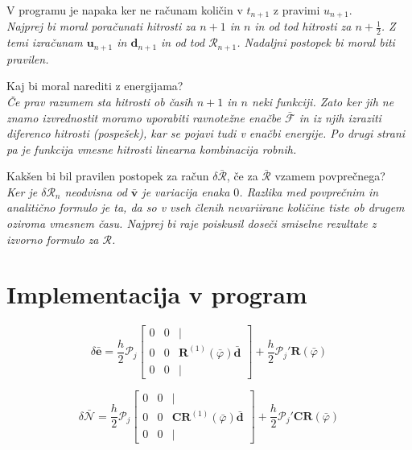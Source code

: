 \documentclass{article}
\newcommand{\dep}[1]{{\scriptstyle(#1)}}
\begin{document}

V programu je napaka ker ne računam količin v $t_{n+1}$ z pravimi $u_{n+1}$.\\
{\it Najprej bi moral poračunati hitrosti za $n+1$ in $n$ in od tod hitrosti za $n+\frac{1}{2}$. Z temi izračunam $\mathbf{u}_{n+1}$ in $\mathbf{d}_{n+1}$ in od tod $\mathcal{R}_{n+1}$. Nadaljni postopek bi moral biti pravilen.}

Kaj bi moral narediti z energijama?\\
{\it Če prav razumem sta hitrosti ob časih $n+1$ in $n$ neki funkciji. Zato ker jih ne znamo izvrednostit moramo uporabiti ravnotežne enačbe $\bar{\mathcal{F}}$ in iz njih izraziti diferenco hitrosti (pospešek), kar se pojavi tudi v enačbi energije. Po drugi strani pa je funkcija vmesne hitrosti linearna kombinacija robnih.}

Kakšen bi bil pravilen postopek za račun $\delta\bar{\mathcal{R}}$, če za $\bar{\mathcal{R}}$ vzamem povprečnega?\\
{\it Ker je $\delta\mathcal{R}_n$ neodvisna od $\bar{\mathbf{v}}$ je variacija enaka $0$. Razlika med povprečnim in analitično formulo je ta, da so v vseh členih nevariirane količine tiste ob drugem oziroma vmesnem času. Najprej bi raje poiskusil doseči smiselne rezultate z izvorno formulo za $\mathcal{R}$.}





\newpage
\section{Implementacija v program}
$$\delta\bar{\mathbf{e}} = \frac{h}{2}\mathcal{P}_j
\begin{bmatrix}
0 & 0 & | \\
	0 & 0 & \mathbf{R}^{(1)}\dep{\bar{\varphi}}\bar{\mathbf{d}} \\
0 & 0 & |
\end{bmatrix} + \frac{h}{2}\mathcal{P}_j' \mathbf{R}\dep{\bar{\varphi}}$$


$$\delta\bar{\mathcal{N}} = \frac{h}{2}\mathcal{P}_j
\begin{bmatrix}
0 & 0 & | \\
0 & 0 & \mathbf{CR}^{(1)}\dep{\bar{\varphi}}\bar{\mathbf{d}} \\
0 & 0 & |
\end{bmatrix} + \frac{h}{2}\mathcal{P}_j' \mathbf{CR}\dep{\bar{\varphi}}$$
\end{document}
